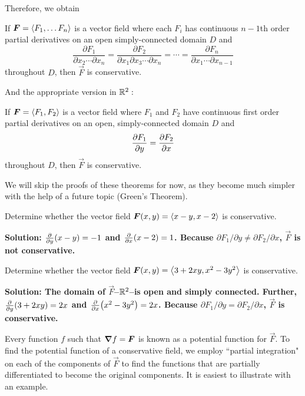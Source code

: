 Therefore, we obtain
\begin{theorem}
    If $\boldsymbol{F} = \left\langle F_1, \dots F_n\right\rangle$ is a vector field where each $F_i$ has continuous $n-1$th order partial derivatives on an open simply-connected domain $D$ and 
    \[ \frac{\partial F_1}{\partial x_2\cdots\partial x_n} = \frac{\partial F_2}{\partial x_1\partial x_3\cdots\partial x_n} = \cdots = \frac{\partial F_n}{\partial x_1\cdots\partial x_{n-1}} \]
    throughout $D$, then $\vec F$ is conservative.
\end{theorem}
And the appropriate version in $\mathbb{R}^2:$
\begin{theorem}
     If $\boldsymbol{F} = \left\langle F_1, F_2\right\rangle$ is a vector field where $F_1$ and $F_2$ have continuous first order partial derivatives on an open, simply-connected domain $D$ and
    \[ \pdv{F_1}{y} = \pdv{F_2}{x} \]
    throughout $D$, then $\vec F$ is conservative. \label{gthmprf}
\end{theorem}
We will skip the proofs of these theorems for now, as they become much simpler with the help of a future topic (Green's Theorem).
\begin{example}
    Determine whether the vector field $\boldsymbol{F}(x,y) = \left\langle x-y, x-2\right\rangle$ is conservative.\par
    \bf{Solution:} $\pdv{y}(x-y) = -1$ and $\pdv{x}(x-2)=1$. Because $\partial F_1 / \partial y \neq \partial F_2 / \partial x$, $\vec F$ is not conservative.
\end{example}
\begin{example}
    Determine whether the vector field $\boldsymbol{F}(x,y)=\left\langle 3+2xy, x^2-3y^2\right\rangle$ is conservative.\par
    \bf{Solution:} The domain of $\vec F$--$\mathbb{R}^2$--is open and simply connected. Further, $\pdv{y}(3+2xy) = 2x$ and $\pdv{x}(x^2-3y^2)=2x$. Because $\partial F_1 / \partial y = \partial F_2 / \partial x$, $\vec F$ is conservative.
\end{example}
Every function $f$ such that $\boldsymbol\nabla f = \boldsymbol{F}$ is known as a potential function for $\vec F$. To find the potential function of a conservative field, we employ ``partial integration" on each of the components of $\vec F$ to find the functions that are partially differentiated to become the original components. It is easiest to illustrate with an example.
